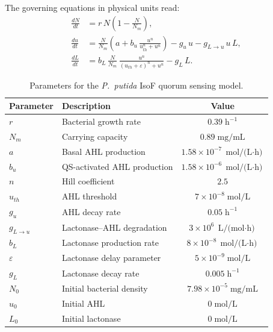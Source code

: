 \documentclass[14pt,a4paper,openany]{extbook}
\begin{document}
The governing equations in physical units read:
\begin{align}
    \frac{dN}{dt} &= r\,N\!\left(1 - \frac{N}{N_m}\right), \label{eq:qs_N}\\[4pt]
    \frac{du}{dt} &= \frac{N}{N_m}\!\left(a + b_u\,
        \frac{u^{n}}{u_{th}^{n} + u^{n}}\right)
        - g_u\,u - g_{L\to u}\,u\,L, \label{eq:qs_u}\\[4pt]
    \frac{dL}{dt} &= b_L\,\frac{N}{N_m}\,
        \frac{u^{n}}{(u_{th}+\varepsilon)^{n} + u^{n}}
        - g_L\,L. \label{eq:qs_L}
\end{align}

\begin{table}[htb]
\centering
\caption[Quorum Sensing Model Parameters]{Parameters for the \textit{P.~putida} IsoF
quorum sensing model.}
\label{tab:qs_params_forward}
\begin{tabular}{llc}
\hline
\textbf{Parameter} & \textbf{Description} & \textbf{Value} \\ \hline
$r$              & Bacterial growth rate          & $0.39\;\mathrm{h}^{-1}$ \\
$N_m$            & Carrying capacity              & $0.89\;\text{mg/mL}$ \\
$a$              & Basal AHL production           & $1.58 \times 10^{-7}\;\text{mol/(L$\cdot$h)}$ \\
$b_u$            & QS-activated AHL production    & $1.58 \times 10^{-6}\;\text{mol/(L$\cdot$h)}$ \\
$n$              & Hill coefficient               & $2.5$ \\
$u_{th}$         & AHL threshold                  & $7 \times 10^{-8}\;\text{mol/L}$ \\
$g_u$            & AHL decay rate                 & $0.05\;\mathrm{h}^{-1}$ \\
$g_{L \to u}$    & Lactonase--AHL degradation     & $3 \times 10^{6}\;\text{L/(mol$\cdot$h)}$ \\
$b_L$            & Lactonase production rate      & $8 \times 10^{-8}\;\text{mol/(L$\cdot$h)}$ \\
$\varepsilon$    & Lactonase delay parameter      & $5 \times 10^{-9}\;\text{mol/L}$ \\
$g_L$            & Lactonase decay rate           & $0.005\;\mathrm{h}^{-1}$ \\ \hline
$N_0$            & Initial bacterial density      & $7.98 \times 10^{-5}\;\text{mg/mL}$ \\
$u_0$            & Initial AHL                    & $0\;\text{mol/L}$ \\
$L_0$            & Initial lactonase              & $0\;\text{mol/L}$ \\ \hline
\end{tabular}
\end{table}
\end{document}
